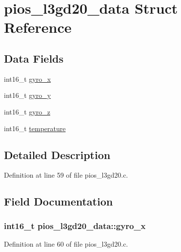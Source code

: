 \hypertarget{structpios__l3gd20__data}{\section{pios\-\_\-l3gd20\-\_\-data \-Struct \-Reference}
\label{structpios__l3gd20__data}
}
\subsection*{\-Data \-Fields}
\begin{DoxyCompactItemize}
\item 
int16\-\_\-t \hyperlink{structpios__l3gd20__data_a5dea5aad2af2bb014e26e8b588afe25f}{gyro\-\_\-x}
\item 
int16\-\_\-t \hyperlink{structpios__l3gd20__data_a2254f9fac6f52d089cd6fb6b4ac59102}{gyro\-\_\-y}
\item 
int16\-\_\-t \hyperlink{structpios__l3gd20__data_ac96a0621539a472ffc044b6246663835}{gyro\-\_\-z}
\item 
int16\-\_\-t \hyperlink{structpios__l3gd20__data_a51c36a0ee690ccc92f547888f0898759}{temperature}
\end{DoxyCompactItemize}


\subsection{\-Detailed \-Description}


\-Definition at line 59 of file pios\-\_\-l3gd20.\-c.



\subsection{\-Field \-Documentation}
\hypertarget{structpios__l3gd20__data_a5dea5aad2af2bb014e26e8b588afe25f}{
\subsubsection[{gyro\-\_\-x}]{\setlength{\rightskip}{0pt plus 5cm}int16\-\_\-t {\bf pios\-\_\-l3gd20\-\_\-data\-::gyro\-\_\-x}}}\label{structpios__l3gd20__data_a5dea5aad2af2bb014e26e8b588afe25f}


\-Definition at line 60 of file pios\-\_\-l3gd20.\-c.

